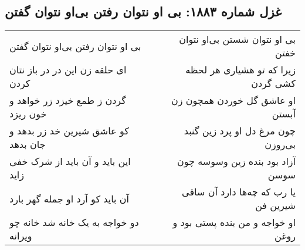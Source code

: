 \begin{center}
\section*{غزل شماره ۱۸۸۳: بی او نتوان رفتن بی‌او نتوان گفتن}
\label{sec:1883}
\begin{longtable}{l p{0.5cm} r}
بی او نتوان رفتن بی‌او نتوان گفتن
&&
بی او نتوان شستن بی‌او نتوان خفتن
\\
ای حلقه زن این در در باز نتان کردن
&&
زیرا که تو هشیاری هر لحظه کشی گردن
\\
گردن ز طمع خیزد زر خواهد و خون ریزد
&&
او عاشق گل خوردن همچون زن آبستن
\\
کو عاشق شیرین خد زر بدهد و جان بدهد
&&
چون مرغ دل او پرد زین گنبد بی‌روزن
\\
این باید و آن باید از شرک خفی زاید
&&
آزاد بود بنده زین وسوسه چون سوسن
\\
آن باید کو آرد او جمله گهر بارد
&&
یا رب که چه‌ها دارد آن ساقی شیرین فن
\\
دو خواجه به یک خانه شد خانه چو ویرانه
&&
او خواجه و من بنده پستی بود و روغن
\\
\end{longtable}
\end{center}
